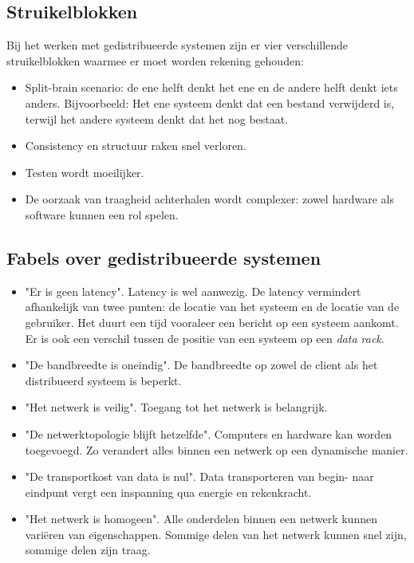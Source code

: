 \documentclass[a4paper,10pt,twoside]{report}
\begin{document}
\subsection{Struikelblokken}

Bij het werken met gedistribueerde systemen zijn er vier verschillende struikelblokken waarmee er moet worden rekening gehouden:

\begin{itemize}
	\item Split-brain scenario: de ene helft denkt het ene en de andere helft denkt iets anders. Bijvoorbeeld: Het ene systeem denkt dat een bestand verwijderd is, terwijl het andere systeem denkt dat het nog bestaat.
	\item Consistency en structuur raken snel verloren.
	\item Testen wordt moeilijker.
	\item De oorzaak van traagheid achterhalen wordt complexer: zowel hardware als software kunnen een rol spelen.
\end{itemize}


\subsection{Fabels over gedistribueerde systemen}


\begin{itemize}
	\item "Er is geen latency". Latency is wel aanwezig. De latency vermindert afhankelijk van twee punten: de locatie van het systeem en de locatie van de gebruiker. Het duurt een tijd vooraleer een bericht op een systeem aankomt. Er is ook een verschil tussen de positie van een systeem op een \textit{data rack}.
	\item "De bandbreedte is oneindig". De bandbreedte op zowel de client als het distribueerd systeem is beperkt.
	\item "Het netwerk is veilig". Toegang tot het netwerk is belangrijk.
	\item "De netwerktopologie blijft hetzelfde". Computers en hardware kan worden toegevoegd. Zo verandert alles binnen een netwerk op een dynamische manier.
	\item "De transportkost van data is nul". Data transporteren van begin- naar eindpunt vergt een inspanning qua energie en rekenkracht.
	\item "Het netwerk is homogeen". Alle onderdelen binnen een netwerk kunnen variëren van eigenschappen. Sommige delen van het netwerk kunnen snel zijn, sommige delen zijn traag.
\end{itemize}
\end{document}
